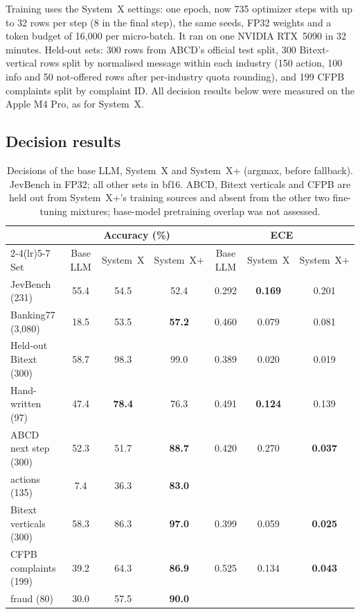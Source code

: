 \documentclass[11pt]{article}
\newcommand{\sysplus}{System~X+}
\begin{document}
Training uses the System~X settings: one epoch, now 735 optimizer steps with up to 32 rows per step (8 in the final step), the same seeds, FP32 weights and a token budget of 16{,}000 per micro-batch. It ran on one NVIDIA RTX~5090 in 32 minutes. Held-out sets: 300 rows from ABCD's official test split, 300 Bitext-vertical rows split by normalised message within each industry (150 action, 100 info and 50 not-offered rows after per-industry quota rounding), and 199 CFPB complaints split by complaint ID. All decision results below were measured on the Apple M4 Pro, as for System~X.

\subsection{Decision results}

\begin{table}[t]
\centering
\caption{Decisions of the base LLM, System~X and \sysplus{} (argmax, before fallback). JevBench in FP32; all other sets in bf16. ABCD, Bitext verticals and CFPB are held out from \sysplus{}'s training sources and absent from the other two fine-tuning mixtures; base-model pretraining overlap was not assessed.}
\label{tab:plus}
\small
\setlength{\tabcolsep}{4pt}
\begin{tabular}{lcccccc}
\toprule
& \multicolumn{3}{c}{Accuracy (\%)} & \multicolumn{3}{c}{ECE} \\
\cmidrule(lr){2-4}\cmidrule(lr){5-7}
Set & Base LLM & System~X & \sysplus{} & Base LLM & System~X & \sysplus{} \\
\midrule
JevBench (231) & 55.4 & 54.5 & 52.4 & 0.292 & \textbf{0.169} & 0.201 \\
Banking77 (3{,}080) & 18.5 & 53.5 & \textbf{57.2} & 0.460 & 0.079 & 0.081 \\
Held-out Bitext (300) & 58.7 & 98.3 & 99.0 & 0.389 & 0.020 & 0.019 \\
Hand-written (97) & 47.4 & \textbf{78.4} & 76.3 & 0.491 & \textbf{0.124} & 0.139 \\
ABCD next step (300) & 52.3 & 51.7 & \textbf{88.7} & 0.420 & 0.270 & \textbf{0.037} \\
\quad actions (135) & 7.4 & 36.3 & \textbf{83.0} & & & \\
Bitext verticals (300) & 58.3 & 86.3 & \textbf{97.0} & 0.399 & 0.059 & \textbf{0.025} \\
CFPB complaints (199) & 39.2 & 64.3 & \textbf{86.9} & 0.525 & 0.134 & \textbf{0.043} \\
\quad fraud (80) & 30.0 & 57.5 & \textbf{90.0} & & & \\
\bottomrule
\end{tabular}
\end{table}
\end{document}
